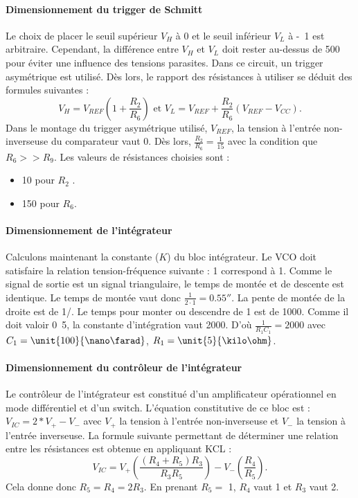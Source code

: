 \paragraph{Dimensionnement du trigger de Schmitt}
Le choix de placer le seuil supérieur $V_H$ à \unit{0}{\volt} 
et le seuil inférieur $V_L$ à \unit{-1}{\volt} est arbitraire. 
Cependant, la différence entre $V_H$ et $V_L$ doit rester au-dessus
de \unit{500}{\milli\volt} pour éviter une influence des tensions parasites.
Dans ce circuit, un trigger asymétrique est utilisé. Dès lors, le rapport
des résistances à utiliser se déduit des formules suivantes : 
\[ V_H = V_{REF}\left(1+\frac{R_2}{R_6}\right) \text{ et } V_L = V_{REF} + \frac{R_2}{R_6}\left(V_{REF}-V_{CC}\right). \]
Dans le montage du trigger asymétrique utilisé, $V_{REF}$, la tension à l'entrée
non-inverseuse du comparateur vaut \unit{0}{\volt}. Dès lors, $\frac{R_2}{R_6}=\frac{1}{15}$
avec la condition que $R_6 >> R_9$. Les valeurs de résistances choisies sont :

\begin{itemize}
	\item \unit{10}{\kilo\ohm} pour $R_2$ .
	\item \unit{150}{\kilo\ohm} pour $R_6$.
\end{itemize}

\paragraph{Dimensionnement de l'intégrateur}
Calculons maintenant la constante ($K$) du bloc intégrateur. Le VCO doit satisfaire
la relation tension-fréquence suivante : \unit{1}{\milli\volt} correspond à \unit{1}{\hertz}. 
Comme le signal de sortie est un signal triangulaire, le temps de montée et de descente est 
identique. Le temps de montée vaut donc $\frac{1}{2\cdot1} = \unit{0.55}{\second}$. 
La pente de montée de la droite est de \unit{1}{\milli\volt}/\unit{}{\second}. 
Le temps pour monter ou descendre de \unit{1}{\volt} est de \unit{1000}{\second}. 
Comme il doit valoir \unit{0.5}{\second}, la constante d'intégration vaut 2000. D'où 
$\frac{1}{R_1C_1} = 2000$ avec $C_1= \unit{100}{\nano\farad}$, $R_1 = \unit{5}{\kilo\ohm}$.
\paragraph{Dimensionnement du contrôleur de l'intégrateur}
Le contrôleur de l'intégrateur est constitué d'un amplificateur opérationnel 
en mode différentiel et d'un switch. L'équation constitutive de ce bloc est : 
$V_{IC}=2*V_+ - V_-$ avec $V_+$ la tension à l'entrée non-inverseuse et $V_-$
la tension à l'entrée inverseuse. La formule suivante permettant de déterminer
une relation entre les résistances est obtenue en appliquant KCL : 
\[ V_{IC}=V_+ \left(\frac{\left(R_4 + R_5\right)R_3}{R_3R_5}\right)-V_-\left(\frac{R_4}{R_5}\right). \] 
Cela donne donc $R_5 = R_4 = 2R_3$. En prenant $R_5 =$ \unit{1}{\kilo\ohm}, $R_4$ vaut \unit{1}{\kilo\ohm}
et $R_3$ vaut \unit{2}{\kilo\ohm}.

